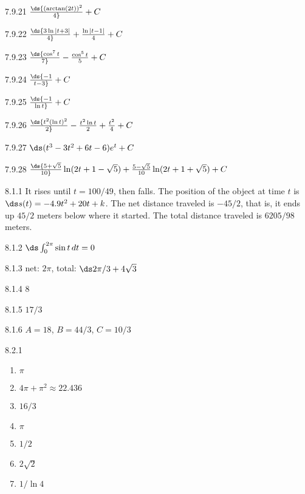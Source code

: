 \begin{Answer}{7.9.21}
 $\ds{(\arctan(2t))^2\over4}+C$
\end{Answer}
\begin{Answer}{7.9.22}
 $\ds{3\ln|t+3|\over 4}+{\ln|t-1|\over4}+C$
\end{Answer}
\begin{Answer}{7.9.23}
 $\ds{\cos^7 t\over 7}-{\cos^5 t\over 5}+C$
\end{Answer}
\begin{Answer}{7.9.24}
 $\ds{-1\over t-3}+C$
\end{Answer}
\begin{Answer}{7.9.25}
 $\ds{-1\over \ln t}+C$
\end{Answer}
\begin{Answer}{7.9.26}
 $\ds{t^2(\ln t)^2\over 2}-{t^2\ln t\over 2}+{t^2\over4}+C$
\end{Answer}
\begin{Answer}{7.9.27}
 $\ds(t^3-3t^2+6t-6)e^t+C$
\end{Answer}
\begin{Answer}{7.9.28}
 $\ds{5+\sqrt5\over10}
\ln(2t+1-\sqrt5)+{5-\sqrt5\over10}\ln(2t+1+\sqrt5)+C$
\end{Answer}
\begin{Answer}{8.1.1}
 It rises until $t=100/49$, then falls. The position of the
object at time $t$ is $\ds s(t)=-4.9t^2+20t+k$. The net distance traveled
is $-45/2$, that is, it ends up $45/2$ meters below where it started.
The total distance traveled is $6205/98$ meters.
\end{Answer}
\begin{Answer}{8.1.2}
 $\ds\int_0^{2\pi}\sin t\,dt=0$
\end{Answer}
\begin{Answer}{8.1.3}
 net: $2\pi$, total: $\ds 2\pi/3+4\sqrt3$
\end{Answer}
\begin{Answer}{8.1.4}
 $8$
\end{Answer}
\begin{Answer}{8.1.5}
 $17/3$
\end{Answer}
\begin{Answer}{8.1.6}
 $A=18$, $B=44/3$, $C=10/3$
\end{Answer}
\begin{Answer}{8.2.1}
\begin{enumerate}
\item {$\pi$}
\item {$4\pi+\pi^2\approx 22.436$}
\item {$16/3$}
\item {$\pi$}
\item {$1/2$}
\item {$2\sqrt{2}$}
\item {$1/\ln 4$}
\end{enumerate}
\end{Answer}
